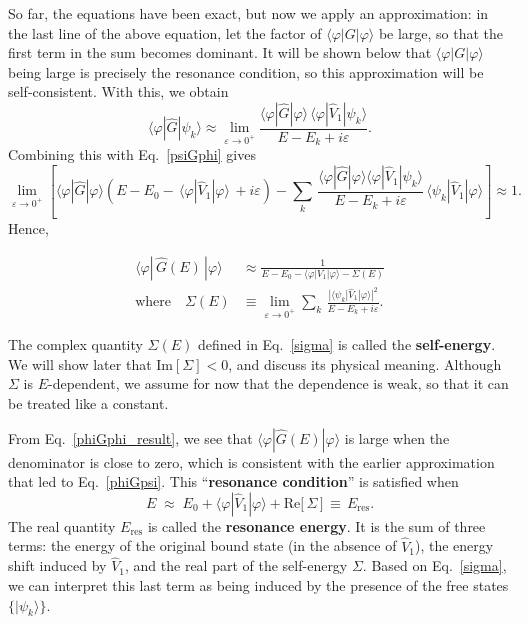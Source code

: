 \documentclass[pra,12pt]{revtex4}
\begin{document}
So far, the equations have been exact, but now we apply an
approximation: in the last line of the above equation, let the factor
of $\langle\varphi|G|\varphi\rangle$ be large, so that the first term
in the sum becomes dominant.  It will be shown below that
$\langle\varphi|G|\varphi\rangle$ being large is precisely the
resonance condition, so this approximation will be self-consistent.
With this, we obtain
\begin{equation}
  \langle\varphi|\hat{G}|\psi_k\rangle \approx \lim_{\varepsilon\rightarrow0^+} \frac{\langle\varphi|\hat{G}|\varphi\rangle \, \langle\varphi|\hat{V}_1|\psi_k\rangle}{E-E_k+i\varepsilon}.
  \label{phiGpsi}
\end{equation}
Combining this with Eq.~\eqref{psiGphi} gives
\begin{equation*}
  \lim_{\varepsilon\rightarrow0^+} \left[\langle\varphi|\hat{G}|\varphi\rangle \left(E - E_0 -\, \langle\varphi|\hat{V}_1|\varphi\rangle \, + i\varepsilon\right) - \sum_k\, \frac{\langle\varphi|\hat{G}|\varphi\rangle\langle\varphi|\hat{V}_1|\psi_k\rangle}{E-E_k+i\varepsilon} \, \langle\psi_k| \hat{V}_1|\varphi\rangle\right] \approx 1.
\end{equation*}
Hence,
\begin{framed}
  \begin{align}
    \langle\varphi|\,\hat{G}(E)\,|\varphi\rangle
    &\approx \frac{1}{\displaystyle E - E_0 - \langle\varphi|V_1|\varphi\rangle - \Sigma(E)}
    \label{phiGphi_result} \\
    \mathrm{where}\quad
    \Sigma(E) &\equiv \lim_{\varepsilon\rightarrow0^+}
    \sum_k \, \frac{\displaystyle| \langle\psi_k| \hat{V}_1|\varphi\rangle|^2}{\displaystyle E-E_k+i\varepsilon}.
    \label{sigma}
  \end{align}
\end{framed}
\vskip -0.12in
The complex quantity $\Sigma(E)$ defined in Eq.~\eqref{sigma} is
called the \textbf{self-energy}.  We will show later that
$\mathrm{Im}[\Sigma] < 0$, and discuss its physical meaning.  Although
$\Sigma$ is $E$-dependent, we assume for now that the dependence is
weak, so that it can be treated like a constant.

From Eq.~\eqref{phiGphi_result}, we see that
$\langle\varphi|\hat{G}(E)|\varphi\rangle$ is large when the
denominator is close to zero, which is consistent with the earlier
approximation that led to Eq.~\eqref{phiGpsi}.  This
``\textbf{resonance condition}'' is satisfied when
\begin{equation}
  E \;\approx\; E_0 + \langle\varphi|\hat{V}_1|\varphi\rangle + \mathrm{Re}\big[\,\Sigma\,\big]  \,\equiv \, E_{\mathrm{res}}.
\end{equation}
The real quantity $E_{\mathrm{res}}$ is called the \textbf{resonance
  energy}.  It is the sum of three terms: the energy of the original
bound state (in the absence of $\hat{V}_1$), the energy shift induced
by $\hat{V}_1$, and the real part of the self-energy $\Sigma$.  Based
on Eq.~\eqref{sigma}, we can interpret this last term as being induced
by the presence of the free states $\{|\psi_k\rangle\}$.
\end{document}
